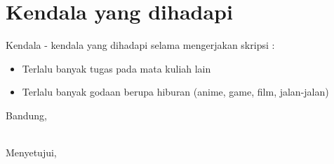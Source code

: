 \documentclass[a4paper,twoside]{article}
\begin{document}
\section{Kendala yang dihadapi}
Kendala - kendala yang dihadapi selama mengerjakan skripsi :
\begin{itemize}
	\item Terlalu banyak tugas pada mata kuliah lain
	\item Terlalu banyak godaan berupa hiburan (anime, game, film, jalan-jalan)
	
\end{itemize}

\vspace{1cm}
\centering Bandung, \tanggal\\
\vspace{2cm} \nama \\ 
\vspace{1cm}

Menyetujui, \\
\end{document}
